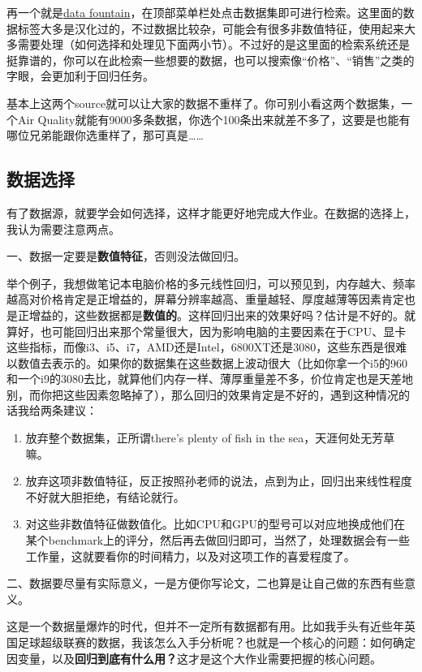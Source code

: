 \documentclass[10pt, a4paper]{article}
\begin{document}
再一个就是\href{https://www.datafountain.cn/}{data fountain}，在顶部菜单栏处点击数据集即可进行检索。这里面的数据标签大多是汉化过的，不过数据比较杂，可能会有很多非数值特征，使用起来大多需要处理（如何选择和处理见下面两小节）。不过好的是这里面的检索系统还是挺靠谱的，你可以在此检索一些想要的数据，也可以搜索像“价格”、“销售”之类的字眼，会更加利于回归任务。\par

基本上这两个source就可以让大家的数据不重样了。你可别小看这两个数据集，一个Air Quality就能有9000多条数据，你选个100条出来就差不多了，这要是也能有哪位兄弟能跟你选重样了，那可真是……

\subsection{数据选择}
有了数据源，就要学会如何选择，这样才能更好地完成大作业。在数据的选择上，我认为需要注意两点。\par
一、数据一定要是\textbf{数值特征}，否则没法做回归。\par
举个例子，我想做笔记本电脑价格的多元线性回归，可以预见到，内存越大、频率越高对价格肯定是正增益的，屏幕分辨率越高、重量越轻、厚度越薄等因素肯定也是正增益的，这些数据都是\textbf{数值的}。这样回归出来的效果好吗？估计是不好的。就算好，也可能回归出来那个常量很大，因为影响电脑的主要因素在于CPU、显卡这些指标，而像i3、i5、i7，AMD还是Intel，6800XT还是3080，这些东西是很难以数值去表示的。如果你的数据集在这些数据上波动很大（比如你拿一个i5的960和一个i9的3080去比，就算他们内存一样、薄厚重量差不多，价位肯定也是天差地别，而你把这些因素忽略掉了），那么回归的效果肯定是不好的，遇到这种情况的话我给两条建议：
\begin{enumerate}
    \item 放弃整个数据集，正所谓there's plenty of fish in the sea，天涯何处无芳草嘛。
    \item 放弃这项非数值特征，反正按照孙老师的说法，点到为止，回归出来线性程度不好就大胆拒绝，有结论就行。
    \item 对这些非数值特征做数值化。比如CPU和GPU的型号可以对应地换成他们在某个benchmark上的评分，然后再去做回归即可，当然了，处理数据会有一些工作量，这就要看你的时间精力，以及对这项工作的喜爱程度了。
\end{enumerate} \par
二、数据要尽量有实际意义，一是方便你写论文，二也算是让自己做的东西有些意义。\par
这是一个数据量爆炸的时代，但并不一定所有数据都有用。比如我手头有近些年英国足球超级联赛的数据，我该怎么入手分析呢？也就是一个核心的问题：如何确定因变量，以及\textbf{回归到底有什么用？}这才是这个大作业需要把握的核心问题。\par
\end{document}
